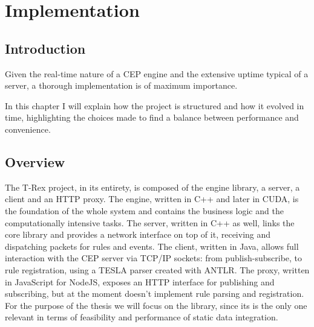 \chapter{Implementation}

\section{Introduction}
Given the real-time nature of a CEP engine and the extensive uptime typical of a server, a thorough implementation is of maximum importance.

In this chapter I will explain how the project is structured and how it evolved in time, highlighting the choices made to find a balance between performance and convenience.

\section{Overview}
The T-Rex project, in its entirety, is composed of the engine library, a server, a client and an HTTP proxy. The engine, written in C++ and later in CUDA, is the foundation of the whole system and contains the business logic and the computationally intensive tasks. The server, written in C++ as well, links the core library and provides a network interface on top of it, receiving and dispatching packets for rules and events. The client, written in Java, allows full interaction with the CEP server via TCP/IP sockets: from publish-subscribe, to rule registration, using a TESLA parser created with ANTLR. The proxy, written in JavaScript for NodeJS, exposes an HTTP interface for publishing and subscribing, but at the moment doesn't implement rule parsing and registration. For the purpose of the thesis we will focus on the library, since its is the only one relevant in terms of feasibility and performance of static data integration.

